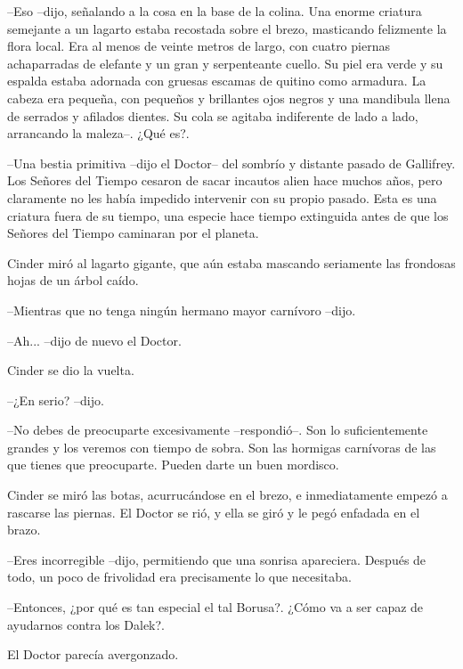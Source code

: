 --Eso --dijo, señalando a la cosa en la base de la colina. Una enorme criatura semejante a un lagarto estaba recostada sobre el brezo, masticando felizmente la flora local. Era al menos de veinte metros de largo, con cuatro piernas achaparradas de elefante y un gran y serpenteante cuello. Su piel era verde y su espalda estaba adornada con gruesas escamas de quitino como armadura. La cabeza era pequeña, con pequeños y brillantes ojos negros y una mandibula llena de serrados y afilados dientes. Su cola se agitaba indiferente de lado a lado, arrancando la maleza--. ¿Qué es?.

--Una bestia primitiva --dijo el Doctor-- del sombrío y distante pasado de Gallifrey. Los Señores del Tiempo cesaron de sacar incautos alien hace muchos años, pero claramente no les había impedido intervenir con su propio pasado. Esta es una criatura fuera de su tiempo, una especie hace tiempo extinguida antes de que los Señores del Tiempo caminaran por el planeta.



Cinder miró al lagarto gigante, que aún estaba mascando seriamente las frondosas hojas de un árbol caído. 



--Mientras que no tenga ningún hermano mayor carnívoro --dijo.

--Ah... --dijo de nuevo el Doctor.



Cinder se dio la vuelta. 



--¿En serio? --dijo.

--No debes de preocuparte excesivamente --respondió--. Son lo suficientemente grandes y los veremos con tiempo de sobra. Son las hormigas carnívoras de las que tienes que preocuparte. Pueden darte un buen mordisco.



Cinder se miró las botas, acurrucándose en el brezo, e inmediatamente empezó a rascarse las piernas. El Doctor se rió, y ella se giró y le pegó enfadada en el brazo. 



--Eres incorregible --dijo, permitiendo que una sonrisa apareciera. Después de todo, un poco de frivolidad era precisamente lo que necesitaba.

--Entonces, ¿por qué es tan especial el tal Borusa?. ¿Cómo va a ser capaz de ayudarnos contra los Dalek?.



El Doctor parecía avergonzado. 



